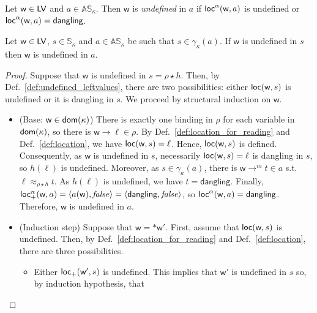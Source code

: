 \begin{definition}\label{def:abstract_undefined_leftvalues}
  Let $\mathsf{w}\in\mathsf{LV}$ and $a\in\mathbb{AS}_\kappa$. Then
  $\mathsf{w}$ is \emph{undefined} in $a$ if $\mathsf{loc}^\alpha(\mathsf{w},a)$ is undefined
  or $\mathsf{loc}^\alpha(\mathsf{w},a)=\mathsf{dangling}$.
\end{definition}

\begin{proposition}
  \label{prop:abstract_undefined_correctness}
  Let $\mathsf{w}\in\mathsf{LV}$, $s\in\mathbb{S}_\kappa$
  and $a\in\mathbb{AS}_\kappa$ be
  such that $s\in\gamma_\kappa(a)$.
  If $\mathsf{w}$ is undefined in $s$ then $\mathsf{w}$ is undefined in $a$.
\end{proposition}
\begin{proof}
  Suppose that $\mathsf{w}$ is undefined in $s=\rho\star h$. Then,
  by Def.~\ref{def:undefined_leftvalues}, there are
  two possibilities: either $\mathsf{loc}(\mathsf{w},s)$ is undefined or it is
  dangling in $s$. We proceed by structural induction on $\mathsf{w}$.
  \begin{itemize}
    \item (Base: $\mathsf{w}\in\mathsf{dom}(\kappa)$)
    There is exactly one binding in $\rho$ for each variable in
    $\mathsf{dom}(\kappa)$, so there is $\mathsf{w}\to\ell\in\rho$.
    By Def.~\ref{def:location_for_reading} and Def.~\ref{def:location},
    we have $\mathsf{loc}(\mathsf{w},s)=\ell$. Hence, $\mathsf{loc}(\mathsf{w},s)$ is defined.
    Consequently, as $\mathsf{w}$ is undefined in $s$, necessarily
    $\mathsf{loc}(\mathsf{w},s)=\ell$ is dangling in $s$, so $h(\ell)$ is
    undefined. Moreover, as $s\in\gamma_\kappa(a)$, there is
    $\mathsf{w}\to^m t\in a$ s.t. $\ell\approx_{\rho\star h}t$.
    As $h(\ell)$ is undefined, we have $t=\mathsf{dangling}$.
    Finally, $\mathsf{loc_+^\alpha}(\mathsf{w},a)=\langle a(\mathsf{w}),\mathit{false}\rangle
    =\langle \mathsf{dangling},\mathit{false}\rangle$, so
    $\mathsf{loc}^\alpha(\mathsf{w},a)=\mathsf{dangling}$. Therefore, $\mathsf{w}$ is
    undefined in $a$.
    \item (Induction step) Suppose that $\mathsf{w} = \mathtt{*}\mathsf{w}'$.
    First, assume that $\mathsf{loc}(\mathsf{w},s)$ is undefined. Then,
    by Def.~\ref{def:location_for_reading} and Def.~\ref{def:location}, there
    are three possibilities.
    \begin{itemize}
      \item Either $\mathsf{loc_+}(\mathsf{w'},s)$ is undefined. This implies that
      $\mathsf{w}'$ is undefined in $s$ so, by induction hypothesis, that

\end{itemize}
\end{itemize}
\end{proof}
